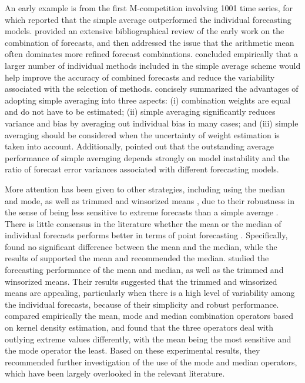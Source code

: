 \documentclass[11pt]{article}
\begin{document}
An early example is from the first M-competition involving 1001 time series, for which \citet{Makridakis1982-hb} reported that the simple average outperformed the individual forecasting models. \citet{Clemen1989-fb} provided an extensive bibliographical review of the early work on the combination of forecasts, and then addressed the issue that the arithmetic mean often dominates more refined forecast combinations. \citet{Makridakis1983-hg} concluded empirically that a larger number of individual methods included in the simple average scheme would help improve the accuracy of combined forecasts and reduce the variability associated with the selection of methods. \citet{Palm1992-im} concisely summarized the advantages of adopting simple averaging into three aspects: (i) combination weights are equal and do not have to be estimated; (ii) simple averaging significantly reduces variance and bias by averaging out individual bias in many cases; and (iii) simple averaging should be considered when the uncertainty of weight estimation is taken into account. Additionally, \citet{Timmermann2006-en} pointed out that the outstanding average performance of simple averaging depends strongly on model instability and the ratio of forecast error variances associated with different forecasting models.

More attention has been given to other strategies, including using the median and mode, as well as trimmed and winsorized means \citep[e.g.,][]{Chan1999-io,Stock2004-rq,Genre2013-ut,Jose2014-uh,Grushka-Cockayne2017-dj}, due to their robustness in the sense of being less sensitive to extreme forecasts than a simple average \citep{Lichtendahl2020-ut}. There is little consensus in the literature whether the mean or the median of individual forecasts performs better in terms of point forecasting \citep{Kolassa2011-ai}. Specifically, \citet{McNees1992-qc} found no significant difference between the mean and the median, while the results of \citet{Stock2004-rq} supported the mean and \citet{Agnew1985-dj} recommended the median. \citet{Jose2008-vm} studied the forecasting performance of the mean and median, as well as the trimmed and winsorized means. Their results suggested that the trimmed and winsorized means are appealing, particularly when there is a high level of variability among the individual forecasts, because of their simplicity and robust performance. \citet{Kourentzes2014-hs} compared empirically the mean, mode and median combination operators based on kernel density estimation, and found that the three operators deal with outlying extreme values differently, with the mean being the most sensitive and the mode operator the least. Based on these experimental results, they recommended further investigation of the use of the mode and median operators, which have been largely overlooked in the relevant literature.
\end{document}
